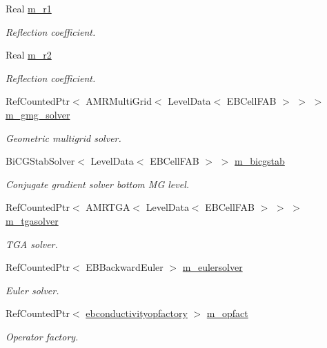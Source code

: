 \begin{DoxyCompactItemize}
\item 
Real \hyperlink{classeddington__sp1_aec8e40277933ad5d0073038c4c9672b3}{m\+\_\+r1}
\begin{DoxyCompactList}\small\item\em Reflection coefficient. \end{DoxyCompactList}\item 
Real \hyperlink{classeddington__sp1_aeb2df73bf465a1d00be7f6e574f74759}{m\+\_\+r2}
\begin{DoxyCompactList}\small\item\em Reflection coefficient. \end{DoxyCompactList}\item 
Ref\+Counted\+Ptr$<$ A\+M\+R\+Multi\+Grid$<$ Level\+Data$<$ E\+B\+Cell\+F\+AB $>$ $>$ $>$ \hyperlink{classeddington__sp1_ab74a65fb54205fe06bae9de1db3deb46}{m\+\_\+gmg\+\_\+solver}
\begin{DoxyCompactList}\small\item\em Geometric multigrid solver. \end{DoxyCompactList}\item 
Bi\+C\+G\+Stab\+Solver$<$ Level\+Data$<$ E\+B\+Cell\+F\+AB $>$ $>$ \hyperlink{classeddington__sp1_a9eeefe164c8f3103d6e5298e4d2542cf}{m\+\_\+bicgstab}
\begin{DoxyCompactList}\small\item\em Conjugate gradient solver bottom MG level. \end{DoxyCompactList}\item 
Ref\+Counted\+Ptr$<$ A\+M\+R\+T\+GA$<$ Level\+Data$<$ E\+B\+Cell\+F\+AB $>$ $>$ $>$ \hyperlink{classeddington__sp1_a1c35e2488bfc64c9e1d6abfe722651be}{m\+\_\+tgasolver}
\begin{DoxyCompactList}\small\item\em T\+GA solver. \end{DoxyCompactList}\item 
Ref\+Counted\+Ptr$<$ E\+B\+Backward\+Euler $>$ \hyperlink{classeddington__sp1_a89b8777e4b8d9e86368e5bb9b39823b7}{m\+\_\+eulersolver}
\begin{DoxyCompactList}\small\item\em Euler solver. \end{DoxyCompactList}\item 
Ref\+Counted\+Ptr$<$ \hyperlink{classebconductivityopfactory}{ebconductivityopfactory} $>$ \hyperlink{classeddington__sp1_a302e326fd8666c8fd04bcad143d96597}{m\+\_\+opfact}
\begin{DoxyCompactList}\small\item\em Operator factory. \end{DoxyCompactList}\item 

\end{DoxyCompactItemize}
